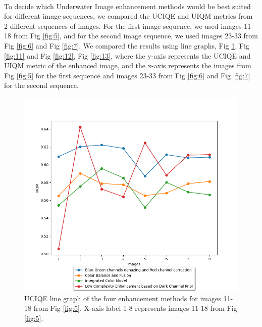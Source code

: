 \documentclass[a4paper,11pt,oneside]{article}
\begin{document}
  \\
  To decide which Underwater Image enhancement methods would be best suited for different image sequences, we compared the UCIQE and UIQM metrics from 2 different sequences of images.
    For the first image sequence, we used images 11-18 from Fig \ref{fig:5}, and for the second image sequence, we used images 23-33 from Fig \ref{fig:6} and Fig \ref{fig:7}. We compared the results using line graphs, Fig \ref{fig:10}, Fig \ref{fig:11} and Fig \ref{fig:12}, Fig \ref{fig:13}, where the y-axis represents the UCIQE and UIQM metric of the enhanced image, and the x-axis represents the images from Fig \ref{fig:5} for the first sequence and images 23-33 from Fig \ref{fig:6} and Fig \ref{fig:7} for the second sequence.
  \begin{figure}[H]
  \begin{center}
  \includegraphics[width=\linewidth]{line_graph_UCIQE_1.png}
  \end{center}
  \caption{UCIQE line graph of the four enhancement methods for images 11-18 from Fig \ref{fig:5}. X-axis label 1-8 represents images 11-18 from Fig \ref{fig:5}.}
  \label{fig:10}
  \end{figure}
\end{document}

